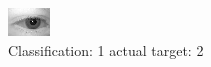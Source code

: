 \begin{figure}[h!]
\begin{center}
\includegraphics[width=0.60\columnwidth]{figures/ID493_class_1_target_2.png}
\end{center}
\caption{ Classification: 1 actual target: 2}
\label{fig:ID493_class_1_target_2}
\end{figure}
